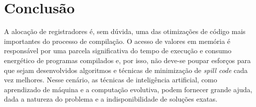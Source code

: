 \documentclass[
	12pt,				%
	openright,			%
	twoside,			%
	a4paper,			%
	tcc,			%
	]{ABNT-DC-UEL}
\begin{document}
\begin{table}[htb]
    \centering
    \caption{Quantidades de acessos à memória em tempo de execução para a heurística original e as duas heurísticas obtidas através do algoritmo evolutivo.}
    \label{tab:pin}
\end{table}

\chapter{Conclusão}

A alocação de registradores é, sem dúvida, uma das otimizações de código mais importantes do processo de compilação. O acesso de valores em memória é responsável por uma parcela significativa do tempo de execução e consumo energético de programas compilados e, por isso, não deve-se poupar esforços para que sejam desenvolvidos algoritmos e técnicas de minimização de \textit{spill code} cada vez melhores. Nesse cenário, as técnicas de inteligência artificial, como aprendizado de máquina e a computação evolutiva, podem fornecer grande ajuda, dada a natureza do problema e a indisponibilidade de soluções exatas.
\end{document}
